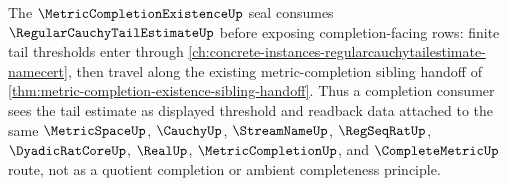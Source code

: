 The $\MetricCompletionExistenceUp$ seal consumes $\RegularCauchyTailEstimateUp$ before exposing completion-facing rows: finite tail thresholds enter through \autoref{ch:concrete-instances-regularcauchytailestimate-namecert}, then travel along the existing metric-completion sibling handoff of \autoref{thm:metric-completion-existence-sibling-handoff}. Thus a completion consumer sees the tail estimate as displayed threshold and readback data attached to the same $\MetricSpaceUp$, $\CauchyUp$, $\StreamNameUp$, $\RegSeqRatUp$, $\DyadicRatCoreUp$, $\RealUp$, $\MetricCompletionUp$, and $\CompleteMetricUp$ route, not as a quotient completion or ambient completeness principle.
